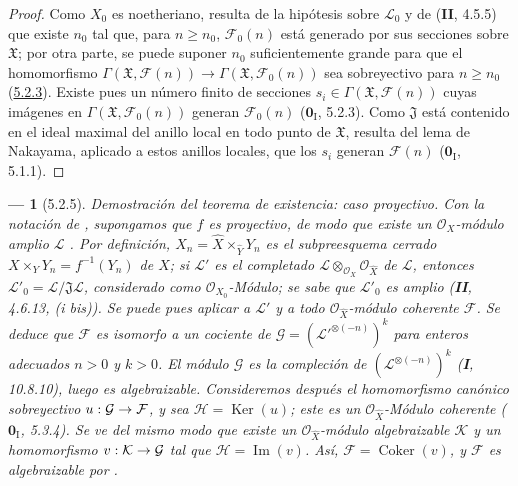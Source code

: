 \documentclass[10pt,oneside,openany]{book}
\theoremstyle{egaenv}\newtheorem*{env}{---}
\theoremstyle{egastatement}
\theoremstyle{egadescription}
\renewcommand{\geq}{\geqslant}
\renewcommand{\to}{\mathchoice{\longrightarrow}{\rightarrow}{\rightarrow}{\rightarrow}}
\begin{document}
\begin{proof}
Como $X_0$ es noetheriano, resulta de la hipótesis sobre $\mathcal L_0$ y de
(\textbf{II}, 4.5.5) que existe $n_0$ tal que, para $n\geq n_0$, $\mathcal F_0(n)$ está
generado por sus secciones sobre $\mathfrak X$; por otra parte, se puede suponer
$n_0$ suficientemente grande para que el homomorfismo
$\Gamma(\mathfrak X,\mathcal F(n))\longrightarrow
\Gamma(\mathfrak X,\mathcal F_0(n))$
sea sobreyectivo para $n\geq n_0$ (\hyperref[III.5.2.3-fr]{5.2.3}). Existe pues
un número finito de secciones $s_i\in\Gamma(\mathfrak X,\mathcal F(n))$ cuyas
imágenes en $\Gamma(\mathfrak X,\mathcal F_0(n))$ generan $\mathcal F_0(n)$
($\mathbf{0}_{\mathrm I}$, 5.2.3). Como $\mathfrak J$ está contenido en el ideal maximal del
anillo local en todo punto de $\mathfrak X$, resulta del lema de Nakayama,
aplicado a estos anillos locales, que los $s_i$ generan $\mathcal F(n)$
($\mathbf{0}_{\mathrm I}$, 5.1.1).
\end{proof}

\begin{env}[5.2.5]
\label{III.5.2.5}
\label{III.5.2.5-fr}
\emph{Demostración del teorema de existencia: caso proyectivo.}
Con la notación de , supongamos que $f$ es
\emph{proyectivo}, de modo que existe un $\mathcal O_X$-módulo amplio $\mathcal L$
. Por definición,
$X_n=\widehat X\times_{\widehat Y}Y_n$
es el subpreesquema cerrado
$X\times_Y Y_n=f^{-1}(Y_n)$ de $X$; si
$\mathcal L'$ es el
completado $\mathcal L\otimes_{\mathcal O_X}\mathcal O_{\widehat X}$ de $\mathcal L$, entonces
$\mathcal L'_0=\mathcal L/\mathfrak J\mathcal L$, considerado como
$\mathcal O_{X_0}$-Módulo; se sabe que $\mathcal L'_0$ es \emph{amplio}
(\textbf{II}, 4.6.13, (i \emph{bis})). Se puede pues aplicar a $\mathcal L'$ y a todo
$\mathcal O_{\widehat X}$-módulo coherente $\mathcal F$. Se deduce que
$\mathcal F$ es isomorfo a un cociente de
$\mathcal G=(\mathcal L'^{\otimes(-n)})^k$
para enteros adecuados $n>0$ y $k>0$. El módulo $\mathcal G$ es la
compleción de $(\mathcal L^{\otimes(-n)})^k$ (\textbf{I}, 10.8.10), luego es algebraizable. Consideremos después el homomorfismo canónico sobreyectivo $u:\mathcal G\to\mathcal F$, y sea $\mathcal H=\operatorname{Ker}(u)$; este es un
$\mathcal O_{\widehat X}$-Módulo coherente ($\mathbf{0}_{\mathrm I}$, 5.3.4). Se ve del
mismo modo que existe un $\mathcal O_{\widehat X}$-módulo algebraizable $\mathcal K$ y un homomorfismo
$v:\mathcal K\to\mathcal G$ tal que $\mathcal H=\operatorname{Im}(v)$. Así,
$\mathcal F=\operatorname{Coker}(v)$, y $\mathcal F$ es algebraizable por
.
\end{env}
\end{document}

